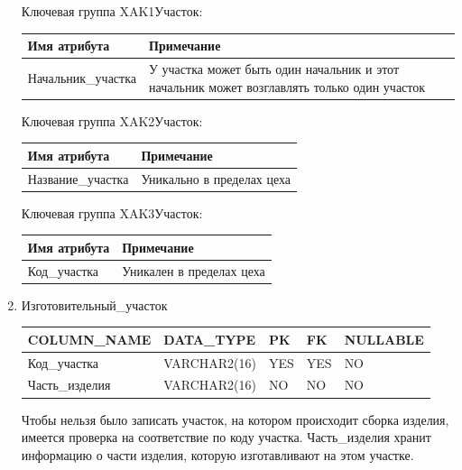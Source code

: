 \begin{enumerate}
    Ключевая группа XAK1Участок:

    \begin{tabular}{|p{7cm}|p{9.3cm}|} \hline

        {\bf Имя атрибута} & {\bf Примечание} \\ \hline
        Начальник\_участка & У участка может быть один начальник и этот начальник может возглавлять только один участок \\ \hline

    \end{tabular}

    Ключевая группа XAK2Участок:

    \begin{tabular}{|p{7cm}|p{9.3cm}|} \hline

        {\bf Имя атрибута} & {\bf Примечание} \\ \hline
        Название\_участка & Уникально в пределах цеха \\ \hline

    \end{tabular}

    Ключевая группа XAK3Участок:

    \begin{tabular}{|p{7cm}|p{9.3cm}|} \hline

        {\bf Имя атрибута} & {\bf Примечание} \\ \hline
        Код\_участка & Уникален в пределах цеха \\ \hline

    \end{tabular}

    \item{Изготовительный\_участок}

    \begin{tabular}{|p{7cm}|p{3cm}|p{1cm}|p{1cm}|p{3cm}|} \hline

        {\bf COLUMN\_NAME} & {\bf DATA\_TYPE} & {\bf PK} & {\bf FK} & {\bf NULLABLE} \\ \hline
        Код\_участка & VARCHAR2(16) & YES & YES & NO \\ \hline
        Часть\_изделия & VARCHAR2(16) & NO & NO & NO \\ \hline

    \end{tabular}

    Чтобы нельзя было записать участок, на котором происходит сборка изделия, имеется проверка на соответствие по коду участка.
    Часть\_изделия хранит информацию о части изделия, которую изготавливают на этом участке.


\end{enumerate}
